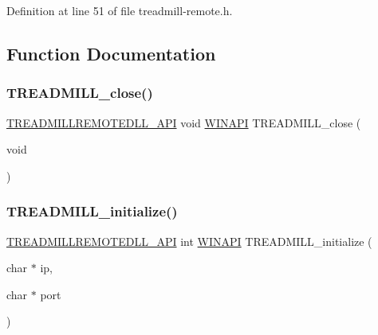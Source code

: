 Definition at line 51 of file treadmill-\/remote.\+h.



\subsection{Function Documentation}
\mbox{\label{treadmill-remote_8h_a884dca17af0cb6c068caeadc3ebe9a5e}} 
\subsubsection{\texorpdfstring{T\+R\+E\+A\+D\+M\+I\+L\+L\+\_\+close()}{TREADMILL\_close()}}
{\footnotesize\ttfamily \hyperlink{treadmill-remote_8h_a227455497d4d32bfe49f1f795b27c6cc}{T\+R\+E\+A\+D\+M\+I\+L\+L\+R\+E\+M\+O\+T\+E\+D\+L\+L\+\_\+\+A\+PI} void \hyperlink{treadmill-remote_8h_a9aa60e1ead64be77ad551e745cbfd4d3}{W\+I\+N\+A\+PI} T\+R\+E\+A\+D\+M\+I\+L\+L\+\_\+close (\begin{DoxyParamCaption}\item[{void}]{ }\end{DoxyParamCaption})}

\mbox{\label{treadmill-remote_8h_a9359937c6d3e08d705bc274f0f479032}} 
\subsubsection{\texorpdfstring{T\+R\+E\+A\+D\+M\+I\+L\+L\+\_\+initialize()}{TREADMILL\_initialize()}}
{\footnotesize\ttfamily \hyperlink{treadmill-remote_8h_a227455497d4d32bfe49f1f795b27c6cc}{T\+R\+E\+A\+D\+M\+I\+L\+L\+R\+E\+M\+O\+T\+E\+D\+L\+L\+\_\+\+A\+PI} int \hyperlink{treadmill-remote_8h_a9aa60e1ead64be77ad551e745cbfd4d3}{W\+I\+N\+A\+PI} T\+R\+E\+A\+D\+M\+I\+L\+L\+\_\+initialize (\begin{DoxyParamCaption}\item[{char $\ast$}]{ip,  }\item[{char $\ast$}]{port }\end{DoxyParamCaption})}

